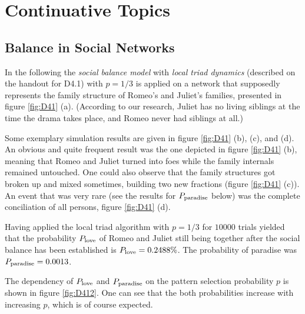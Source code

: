 \documentclass{scrartcl}
\begin{document}

\clearpage
\setcounter{section}{3}
\section{Continuative Topics}
\subsection{Balance in Social Networks}
In the following the \emph{social balance model} with \emph{local triad
dynamics} (described on the handout for D4.1) with $p = 1/3$ is applied on
a network that supposedly represents the family structure of Romeo's and
Juliet's families, presented in figure \ref{fig:D41} (a).  (According to
our research, Juliet has no living siblings at the time the drama takes
place, and Romeo never had siblings at all.)

Some exemplary simulation results are given in figure \ref{fig:D41} (b),
(c), and (d).
An obvious and quite frequent result was the one depicted in figure \ref{fig:D41}
(b), meaning that Romeo and Juliet turned into foes while the family
internals remained untouched.  One could also observe that the family
structures got broken up and mixed sometimes, building two new fractions
(figure \ref{fig:D41} (c)). An event that was very rare (see the results for
$P_{\mathrm{paradise}}$ below) was the complete conciliation of all persons,
figure \ref{fig:D41} (d).

Having applied the local triad algorithm with $p = 1/3$ for $10000$ trials
yielded that the probability $P_{\mathrm{love}}$ of Romeo and Juliet still being together after
the social balance has been established is $P_{\mathrm{love}} = 0.2488\%$.
The probability of paradise was $P_{\mathrm{paradise}} = 0.0013$.

The dependency of $P_{\mathrm{love}}$ and $P_{\mathrm{paradise}}$ on the pattern
selection probability $p$ is shown in figure \ref{fig:D412}. One can
see that the both probabilities increase with increasing $p$, which is
of course expected.
\end{document}
